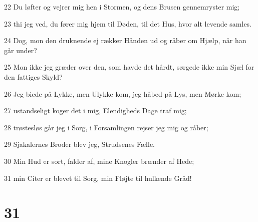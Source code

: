 \par 22 Du løfter og vejrer mig hen i Stormen, og dens Brusen gennemryster mig;
\par 23 thi jeg ved, du fører mig hjem til Døden, til det Hus, hvor alt levende samles.
\par 24 Dog, mon den druknende ej rækker Hånden ud og råber om Hjælp, når han går under?
\par 25 Mon ikke jeg græder over den, som havde det hårdt, sørgede ikke min Sjæl for den fattiges Skyld?
\par 26 Jeg biede på Lykke, men Ulykke kom, jeg håbed på Lys, men Mørke kom;
\par 27 ustandseligt koger det i mig, Elendigheds Dage traf mig;
\par 28 trøstesløs går jeg i Sorg, i Forsamlingen rejser jeg mig og råber;
\par 29 Sjakalernes Broder blev jeg, Strudsenes Fælle.
\par 30 Min Hud er sort, falder af, mine Knogler brænder af Hede;
\par 31 min Citer er blevet til Sorg, min Fløjte til hulkende Gråd!

\chapter{31}


